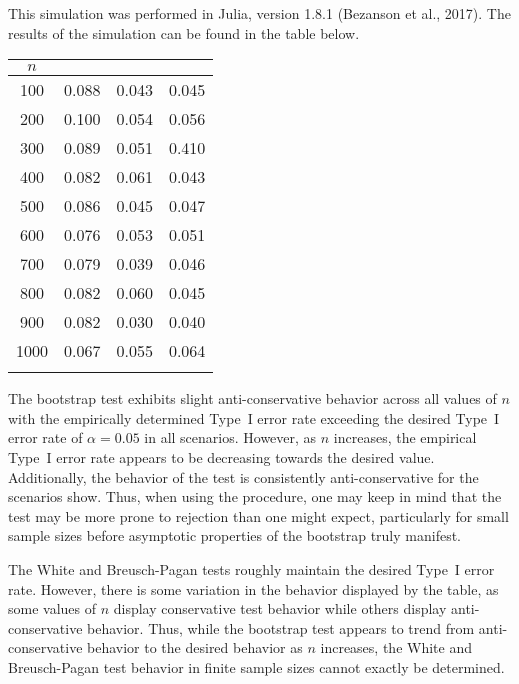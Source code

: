 		This simulation was performed in Julia, version 1.8.1 (Bezanson et al., 2017). The results of the simulation can be found in the table below.

		\begin{table}[H]
			\centering
			\small\addtolength{\tabcolsep}{-3pt}
			\setlength\extrarowheight{-3pt}
			{
			\begin{tabular}{ c|c|c|c}
			$n$ & \vtop{\hbox{\strut Bootstrap}\hbox{\strut Test}} & \vtop{\hbox{\strut White}\hbox{\strut Test}} & \vtop{\hbox{\strut Breusch-Pagan} \hbox{\strut Test}} \\
			 \hline
			 100 & 0.088 & 0.043 & 0.045 \\
			 200 & 0.100 & 0.054 & 0.056 \\
			 300 & 0.089 & 0.051 & 0.410 \\
			 400 & 0.082 & 0.061 & 0.043 \\
			 500 & 0.086 & 0.045 & 0.047 \\
			 600 & 0.076 & 0.053 & 0.051 \\
			 700 & 0.079 & 0.039 & 0.046 \\
			 800 & 0.082 & 0.060 & 0.045 \\
			 900 & 0.082 & 0.030 & 0.040 \\
			 1000 & 0.067 & 0.055 & 0.064 \\
			 \Xhline{3\arrayrulewidth}
			\end{tabular}
			}
		\end{table}

		The bootstrap test exhibits slight anti-conservative behavior across all values of $n$ with the empirically determined Type~I error rate exceeding the desired Type~I error rate
		of $\alpha = 0.05$ in all scenarios. However, as $n$ increases, the empirical Type~I error rate appears to be decreasing towards the desired value. Additionally, the
		behavior of the test is consistently anti-conservative for the scenarios show. Thus, when using the procedure, one may keep in mind that the test may be more prone to
		rejection than one might expect, particularly for small sample sizes before asymptotic properties of the bootstrap truly manifest.

		The White and Breusch-Pagan tests roughly maintain the desired Type~I error rate. However, there is some variation in the behavior displayed by the table, as some values
		of $n$ display conservative test behavior while others display anti-conservative behavior. Thus, while the bootstrap test appears to trend from anti-conservative behavior
		to the desired behavior as $n$ increases, the White and Breusch-Pagan test behavior in finite sample sizes cannot exactly be determined.

